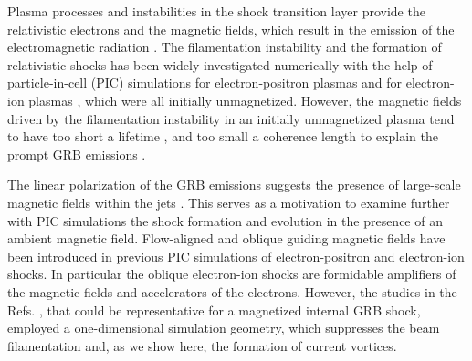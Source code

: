 \documentclass[twocolumn,showpacs,preprintnumbers,amsmath,amssymb]{revtex4}
\begin{document}
Plasma processes and instabilities in the shock transition layer provide the relativistic 
electrons and the magnetic fields, which result in the emission of the electromagnetic 
radiation \cite{Filament,Bret,Schlickeiser}. The filamentation instability and the formation 
of relativistic shocks has been widely investigated numerically with the help of particle-in-cell 
(PIC) simulations for electron-positron plasmas \cite{Kazimura,Silva,Jaroschek} and for electron-ion 
plasmas \cite{Frederiksen,Spitkovsky,Martins}, which were all initially unmagnetized. However, the 
magnetic fields driven by the filamentation instability in an initially unmagnetized plasma tend to 
have too short a lifetime , and too small a coherence length to explain the prompt 
GRB emissions \cite{Waxman}.

The linear polarization of the GRB emissions suggests the presence of large-scale magnetic fields 
within the jets \cite{Lyutikov}. This serves as a motivation to examine further with PIC simulations 
the shock formation and evolution in the presence of an ambient magnetic field. Flow-aligned 
\cite{Hededal} and oblique \cite{Ohsawa,Dieckmann,Sironi} guiding magnetic fields have been introduced 
in previous PIC simulations of electron-positron and electron-ion shocks. In particular the oblique 
electron-ion shocks are formidable amplifiers of the magnetic fields and accelerators of the electrons. 
However, the studies in the Refs. \cite{Ohsawa,Dieckmann}, that could be representative for a magnetized internal 
GRB shock, employed a one-dimensional simulation geometry, which suppresses the beam 
filamentation and, as we show here, the formation of current vortices. 
\end{document}
